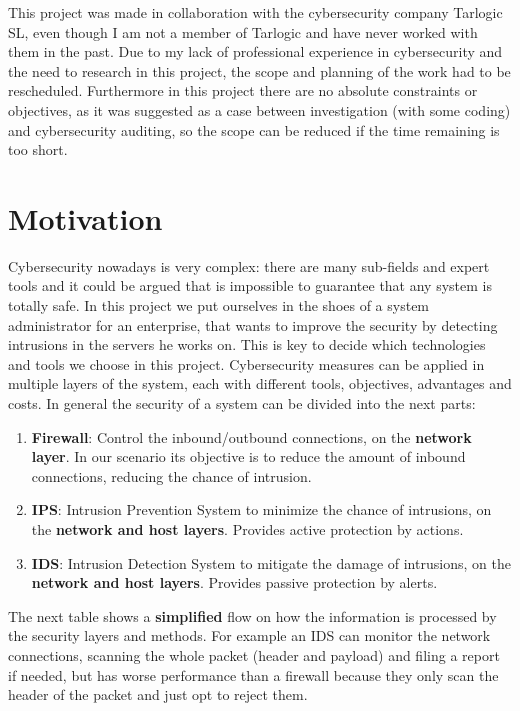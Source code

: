 
This project was made in collaboration with the cybersecurity company Tarlogic SL, even though I am not a member of Tarlogic and have never worked with them in the past.
Due to my lack of professional experience in cybersecurity and the need to research in this project, the scope and planning of the work had to be rescheduled.
Furthermore in this project there are no absolute constraints or objectives, as it was suggested as a case between investigation (with some coding) and cybersecurity auditing, so the scope can be reduced if the time remaining is too short.

\section{Motivation}

Cybersecurity nowadays is very complex: there are many sub-fields and expert tools and it could be argued that is impossible to guarantee that any system is totally safe.
In this project we put ourselves in the shoes of a system administrator for an enterprise, that wants to improve the security by detecting intrusions in the servers he works on. This is key to decide which technologies and tools we choose in this project.
\linej
\linej
Cybersecurity measures can be applied in multiple layers of the system, each with different tools, objectives, advantages and costs.
In general the security of a system can be divided into the next parts:
\begin{enumerate}
	\item \textbf{Firewall}: Control the inbound/outbound connections, on the \textbf{network layer}. In our scenario its objective is to reduce the amount of inbound connections, reducing the chance of intrusion.
	\item \textbf{IPS}: Intrusion Prevention System to minimize the chance of intrusions, on the \textbf{network and host layers}. Provides active protection by actions.
	\item \textbf{IDS}: Intrusion Detection System to mitigate the damage of intrusions, on the \textbf{network and host layers}. Provides passive protection by alerts.
\end{enumerate}

\linej
The next table shows a \textbf{simplified} flow on how the information is processed by the security layers and methods.
For example an IDS can monitor the network connections, scanning the whole packet (header and payload) and filing a report if needed, but has worse performance than a firewall because they only scan the header of the packet and just opt to reject them\cite{firewall-ipds-ids_comparison}.

